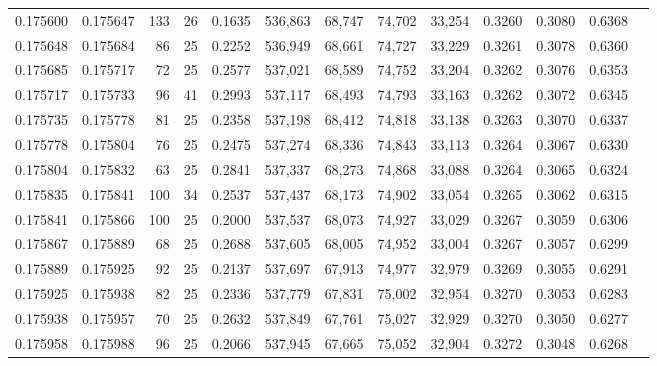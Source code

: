 \begin{tabular}{rrrrrrrrrrrrr}
0.175600 & 0.175647 & 133 &  26 &                                     0.1635 & 536,863 &  68,747 &  74,702 &  33,254 & 0.3260 & 0.3080 & 0.6368 \\
0.175648 & 0.175684 &  86 &  25 &                                     0.2252 & 536,949 &  68,661 &  74,727 &  33,229 & 0.3261 & 0.3078 & 0.6360 \\
0.175685 & 0.175717 &  72 &  25 &                                     0.2577 & 537,021 &  68,589 &  74,752 &  33,204 & 0.3262 & 0.3076 & 0.6353 \\
0.175717 & 0.175733 &  96 &  41 &                                     0.2993 & 537,117 &  68,493 &  74,793 &  33,163 & 0.3262 & 0.3072 & 0.6345 \\
0.175735 & 0.175778 &  81 &  25 &                                     0.2358 & 537,198 &  68,412 &  74,818 &  33,138 & 0.3263 & 0.3070 & 0.6337 \\
0.175778 & 0.175804 &  76 &  25 &                                     0.2475 & 537,274 &  68,336 &  74,843 &  33,113 & 0.3264 & 0.3067 & 0.6330 \\
0.175804 & 0.175832 &  63 &  25 &                                     0.2841 & 537,337 &  68,273 &  74,868 &  33,088 & 0.3264 & 0.3065 & 0.6324 \\
0.175835 & 0.175841 & 100 &  34 &                                     0.2537 & 537,437 &  68,173 &  74,902 &  33,054 & 0.3265 & 0.3062 & 0.6315 \\
0.175841 & 0.175866 & 100 &  25 &                                     0.2000 & 537,537 &  68,073 &  74,927 &  33,029 & 0.3267 & 0.3059 & 0.6306 \\
0.175867 & 0.175889 &  68 &  25 &                                     0.2688 & 537,605 &  68,005 &  74,952 &  33,004 & 0.3267 & 0.3057 & 0.6299 \\
0.175889 & 0.175925 &  92 &  25 &                                     0.2137 & 537,697 &  67,913 &  74,977 &  32,979 & 0.3269 & 0.3055 & 0.6291 \\
0.175925 & 0.175938 &  82 &  25 &                                     0.2336 & 537,779 &  67,831 &  75,002 &  32,954 & 0.3270 & 0.3053 & 0.6283 \\
0.175938 & 0.175957 &  70 &  25 &                                     0.2632 & 537,849 &  67,761 &  75,027 &  32,929 & 0.3270 & 0.3050 & 0.6277 \\
0.175958 & 0.175988 &  96 &  25 &                                     0.2066 & 537,945 &  67,665 &  75,052 &  32,904 & 0.3272 & 0.3048 & 0.6268 \\

\end{tabular}
